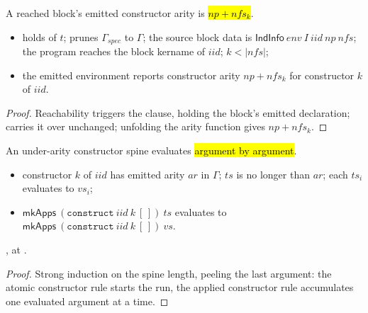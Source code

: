 \begin{lemma}
\label{lem:ErasesEnv-ctorArity}
\leanok
{}
 A reached block's emitted constructor arity is \hl{$np + nfs_k$}.
\begin{itemize}
\item {} \ErasesEnv{} holds of $t$; \LowerEnv{} prunes $\Gamma_{spec}$ to $\Gamma$; the source
block data is $\mathsf{IndInfo}\ env\ I\ iid\ np\ nfs$; the program reaches the block kername of $iid$;
$k < |nfs|$;
\item {} the emitted environment reports constructor arity $np + nfs_k$ for constructor $k$ of
$iid$.
\end{itemize}
\end{lemma}
\begin{proof}
\leanok
{}
 Reachability triggers the  clause, holding the block's emitted declaration;
\LowerEnv{} carries it over unchanged; unfolding the arity function gives $np + nfs_k$.
\end{proof}

\begin{lemma}
\label{lem:wcbvEval_mkApps_construct}
\leanok
{}
 An under-arity constructor spine evaluates \hl{argument by argument}.
\begin{itemize}
\item {} constructor $k$ of $iid$ has emitted arity $ar$ in $\Gamma$; $ts$ is no longer than
$ar$; each $ts_i$ evaluates to $vs_i$;
\item {} $\mathsf{mkApps}\ (\mathtt{construct}\ iid\ k\ [\,])\ ts$ evaluates to
$\mathsf{mkApps}\ (\mathtt{construct}\ iid\ k\ [\,])\ vs$.
\end{itemize}
 , at .
\end{lemma}
\begin{proof}
\leanok
{}
 Strong induction on the spine length, peeling the last argument: the atomic constructor rule
starts the run, the applied constructor rule accumulates one evaluated argument at a time.
\end{proof}

